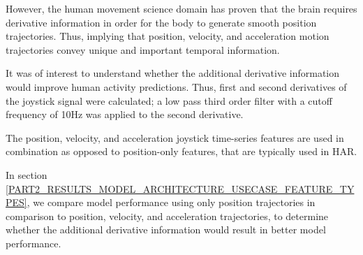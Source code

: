 \documentclass{ieeeaccess}
\begin{document}
However, the human movement science domain has proven that the brain requires derivative information in order for the body to generate smooth position trajectories\cite{}. Thus, implying that position, velocity, and acceleration motion trajectories convey unique and important temporal information. 

It was of interest to understand whether the additional derivative information would improve human activity predictions. Thus, first and second derivatives of the joystick signal were calculated; a low pass third order filter with a cutoff frequency of 10Hz was applied to the second derivative. 

The position, velocity, and acceleration joystick time-series features are used in combination as opposed to position-only features, that are typically used in HAR. 

In section \ref{PART2_RESULTS_MODEL_ARCHITECTURE_USECASE_FEATURE_TYPES}, we compare model performance using only position trajectories in comparison to position, velocity, and acceleration trajectories, to determine whether the additional derivative information would result in better model performance.
\end{document}
